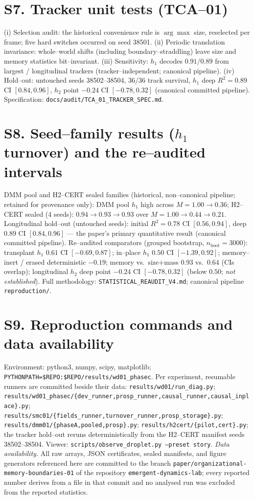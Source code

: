 \documentclass[11pt]{article}
\begin{document}
\section{S7. Tracker unit tests (TCA--01)}
(i) Selection audit: the historical convenience rule is $\arg\max$ size, reselected per frame; five hard
switches occurred on seed 38501. (ii) Periodic translation invariance: whole--world shifts (including
boundary--straddling) leave size and memory statistics bit--invariant. (iii) Sensitivity: $h_1$ decodes
$0.91/0.89$ from largest / longitudinal trackers (tracker--independent; canonical pipeline).
(iv) Hold--out: untouched seeds 38502--38504, $36/36$ track survival, $h_1$ deep $R^2=0.89$ CI $[0.84,0.96]$, $h_2$ point $-0.24$ CI $[-0.78,0.32]$ (canonical committed pipeline). Specification: \texttt{docs/audit/TCA\_01\_TRACKER\_SPEC.md}.

\section{S8. Seed--family results ($h_1$ turnover) and the re--audited intervals}
DMM pool and H2--CERT sealed families (historical, non--canonical pipeline; retained for provenance only): DMM pool $h_1$ high across $M=1.00\to0.36$; H2--CERT sealed (4 seeds):
$0.94\to0.93\to0.93$ over $M=1.00\to0.44\to0.21$. Longitudinal hold--out (untouched seeds): initial $R^2=0.78$ CI $[0.56,0.94]$, deep $0.89$ CI $[0.84,0.96]$ --- the paper's primary quantitative result (canonical committed pipeline).
Re--audited comparators (grouped bootstrap, $n_{\mathrm{boot}}=3000$): transplant $h_1$ $0.61$ CI
$[-0.69,0.87]$; in--place $h_1$ $0.50$ CI $[-1.39,0.92]$; memory--inert / erased deterministic $-0.19$;
memory vs.\ size$+$mass $0.93$ vs.\ $0.64$ (CIs overlap); longitudinal $h_2$ deep point $-0.24$ CI $[-0.78,0.32]$ (below $0.50$; \emph{not established}). Full methodology: \texttt{STATISTICAL\_REAUDIT\_V4.md}; canonical pipeline \texttt{reproduction/}.

\section{S9. Reproduction commands and data availability}
Environment: python3, numpy, scipy, matplotlib; \texttt{PYTHONPATH=\$REPO:\$REPO/results/wd01\_phasec}.
Per experiment, resumable runners are committed beside their data:
\texttt{results/wd01/run\_diag.py}; \texttt{results/wd01\_phasec/\{dev\_runner,prosp\_runner,causal\_runner,causal\_inplace\}.py};
\texttt{results/smc01/\{fields\_runner,turnover\_runner,prosp\_storage\}.py};
\texttt{results/dmm01/\{phaseA,pooled,prosp\}.py}; \texttt{results/h2cert/\{pilot,cert\}.py};
the tracker hold--out reruns deterministically from the H2--CERT manifest seeds 38502--38504. Viewer:
\texttt{scripts/observe\_droplet.py --preset story}.
\emph{Data availability.} All raw arrays, JSON certificates, sealed manifests, and figure generators
referenced here are committed to the branch \texttt{paper/organizational-memory-boundaries-01} of the
repository \texttt{emergent-dynamics-lab}; every reported number derives from a file in that commit and no
analysed run was excluded from the reported statistics.
\end{document}
